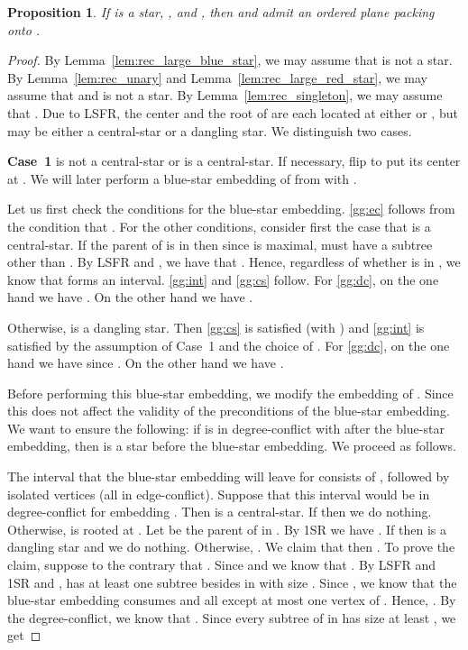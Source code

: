 \documentclass[11pt,a4paper,colorlinks=true,urlcolor=blue,citecolor=red]{article}
\theoremstyle{plain}
\newtheorem{proposition}[theorem]{Proposition}
\newcommand{\case}[1]{\par\vspace{.5\baselineskip}\noindent\textbf{\sffamily Case~#1}}
\begin{document}
\begin{proposition}\label{prop:rec_small_blue_star_equal_ij_not_used}
  If  is a star, , and
  , then  and  admit an ordered plane
  packing onto .
\end{proposition}
\begin{proof}
  By Lemma~\ref{lem:rec_large_blue_star}, we may assume that
   is not a star. By Lemma~\ref{lem:rec_unary} and
  Lemma~\ref{lem:rec_large_red_star}, we may assume that
   and  is not a star. By
  Lemma~\ref{lem:rec_singleton}, we may assume that . Due to
  LSFR, the center and the root of  are each located at either
   or , but  may be either a central-star or a
  dangling star. We distinguish two cases.

  \case{1}  is not a central-star or  is a central-star. If
  necessary, flip  to put its center at . We will later perform a
  blue-star embedding of  from  with .

  Let us first check the conditions for the blue-star embedding.
  \ref{gg:ec} follows from the condition that .
  For the other conditions, consider first the case that  is a
  central-star. If the parent  of  is in  then since
   is maximal,  must have a subtree other than . By
  LSFR and , we have that . Hence, regardless
  of whether  is in , we know that
   forms an interval. \ref{gg:int} and
  \ref{gg:cs} follow. For \ref{gg:dc}, on the one hand we have
  . On the other hand we have
  .

  Otherwise,  is a dangling star. Then \ref{gg:cs} is satisfied
  (with ) and \ref{gg:int} is satisfied by the assumption
  of Case~1 and the choice of . For \ref{gg:dc}, on the one hand
  we have  since .
  On the other hand we have .

  Before performing this blue-star embedding, we modify the embedding
  of . Since  this does not affect
  the validity of the preconditions of the blue-star embedding. We
  want to ensure the following: if  is in degree-conflict with
   after the blue-star embedding, then  is a star
  before the blue-star embedding. We proceed as follows.

  The interval that the blue-star embedding will leave for 
  consists of , followed by  isolated vertices (all
  in edge-conflict). Suppose that this interval would be in
  degree-conflict for embedding . Then
   is a central-star. If
   then we do nothing. Otherwise,  is rooted
  at . Let  be the parent of  in . By 1SR we have
  . If  then  is a dangling
  star and we do nothing. Otherwise, . We claim that
  then . To prove the claim, suppose to the contrary that
  . Since  and
   we know that . By LSFR
  and 1SR and ,  has at least one subtree 
  besides  in  with size
  . Since , we know that the
  blue-star embedding consumes  and all except at most one vertex of
  . Hence, . By the
  degree-conflict, we know that .
  Since every subtree of  in  has size at least , we get


\end{proof}
\end{document}
